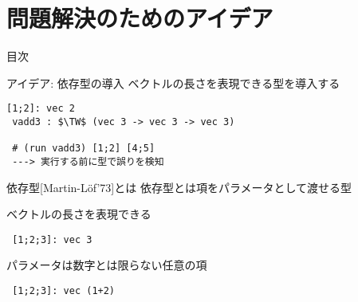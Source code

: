 \documentclass[dvipdfmx,aspectratio=169, 20pt]{beamer}
\renewcommand{\V}{\vdash}
\begin{document}
\section{問題解決のためのアイデア}

\begin{frame}{目次}
    \tableofcontents[currentsection]
\end{frame}

\begin{frame}[fragile]{アイデア: 依存型の導入}
    \renewcommand{\V}{\text{vec}\ }
    ベクトルの長さを表現できる型を導入する
    \begin{exampleblock}{}
        \begin{Verbatim}[commandchars=\\\{\},codes={\catcode`$=3\catcode`^=7}]
 [1;2]: vec 2
 vadd3 : $\TW$ (vec 3 -> vec 3 -> vec 3)

 # (run vadd3) [1;2] [4;5]
 ---> 実行する前に型で誤りを検知
 \end{Verbatim}
    \end{exampleblock}
\end{frame}

\begin{frame}[fragile]{依存型[Martin-L{\"o}f'73]とは}
    \renewcommand{\V}{\text{vec}\ }
    依存型とは項をパラメータとして渡せる型
    \begin{exampleblock}{ベクトルの長さを表現できる}
        \begin{Verbatim}
 [1;2;3]: vec 3
        \end{Verbatim}
    \end{exampleblock}
    \begin{exampleblock}{パラメータは数字とは限らない任意の項}
        \begin{Verbatim}
 [1;2;3]: vec (1+2) 
        \end{Verbatim}
    \end{exampleblock}
\end{frame}
\end{document}
